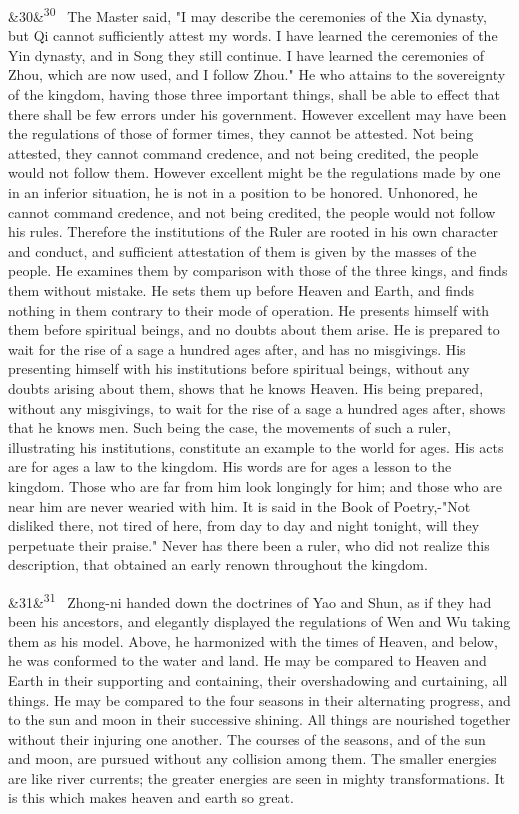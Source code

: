 \documentclass[12pt]{article}
\newcommand{\para}[1][]{\par\noindent\ifx&#1&\else\textsuperscript{\footnotesize #1}~\fi}
\begin{document}
\para[30] The Master said, "I may describe the ceremonies of the Xia dynasty, but Qi cannot sufficiently attest my words. I have learned the ceremonies of the Yin dynasty, and in Song they still continue. I have learned the ceremonies of Zhou, which are now used, and I follow Zhou." He who attains to the sovereignty of the kingdom, having those three important things, shall be able to effect that there shall be few errors under his government. However excellent may have been the regulations of those of former times, they cannot be attested. Not being attested, they cannot command credence, and not being credited, the people would not follow them. However excellent might be the regulations made by one in an inferior situation, he is not in a position to be honored. Unhonored, he cannot command credence, and not being credited, the people would not follow his rules. Therefore the institutions of the Ruler are rooted in his own character and conduct, and sufficient attestation of them is given by the masses of the people. He examines them by comparison with those of the three kings, and finds them without mistake. He sets them up before Heaven and Earth, and finds nothing in them contrary to their mode of operation. He presents himself with them before spiritual beings, and no doubts about them arise. He is prepared to wait for the rise of a sage a hundred ages after, and has no misgivings. His presenting himself with his institutions before spiritual beings, without any doubts arising about them, shows that he knows Heaven. His being prepared, without any misgivings, to wait for the rise of a sage a hundred ages after, shows that he knows men. Such being the case, the movements of such a ruler, illustrating his institutions, constitute an example to the world for ages. His acts are for ages a law to the kingdom. His words are for ages a lesson to the kingdom. Those who are far from him look longingly for him; and those who are near him are never wearied with him. It is said in the Book of Poetry,-"Not disliked there, not tired of here, from day to day and night tonight, will they perpetuate their praise." Never has there been a ruler, who did not realize this description, that obtained an early renown throughout the kingdom.

\para[31] Zhong-ni handed down the doctrines of Yao and Shun, as if they had been his ancestors, and elegantly displayed the regulations of Wen and Wu taking them as his model. Above, he harmonized with the times of Heaven, and below, he was conformed to the water and land. He may be compared to Heaven and Earth in their supporting and containing, their overshadowing and curtaining, all things. He may be compared to the four seasons in their alternating progress, and to the sun and moon in their successive shining. All things are nourished together without their injuring one another. The courses of the seasons, and of the sun and moon, are pursued without any collision among them. The smaller energies are like river currents; the greater energies are seen in mighty transformations. It is this which makes heaven and earth so great.
\end{document}
